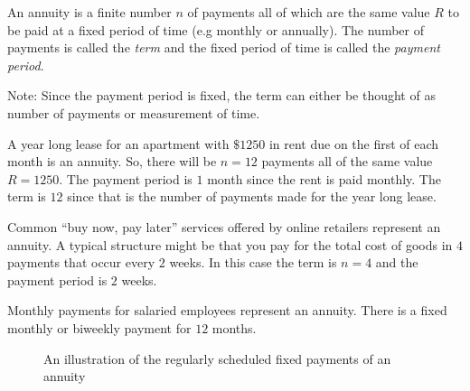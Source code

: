 \begin{definition}
    An annuity is a finite number \(n\) of payments all of which are the same value \(R\) to be paid at a fixed period of time (e.g monthly or annually). The number of payments is called the \emph{term} and the fixed period of time is called the \emph{payment period}.
\end{definition}

Note: Since the payment period is fixed, the term can either be thought of as number of payments or measurement of time.

\begin{example}\label{rentAnn}
    A year long lease for an apartment with \(\$1250\) in rent due on the first of each month is an annuity. So, there will be \(n=12\) payments all of the same value \(R=1250.\) The payment period is \(1\) month since the rent is paid monthly. The term is \(12\) since that is the number of payments made for the year long lease. 
\end{example}

\begin{example}\label{bnplAnn}
    Common ``buy now, pay later'' services offered by online retailers represent an annuity. A typical structure might be that you pay for the total cost of goods in \(4\) payments that occur every \(2\) weeks. In this case the term is \(n=4\) and the payment period is \(2\) weeks.
\end{example}

\begin{example}\label{salaryAnn}
    Monthly payments for salaried employees represent an annuity. There is a fixed monthly or biweekly payment for \(12\) months.
\end{example}

\begin{figure}
\centering
{}
    \caption{An illustration of the regularly scheduled fixed payments of an annuity}
    \label{ordAnn}
\end{figure}

